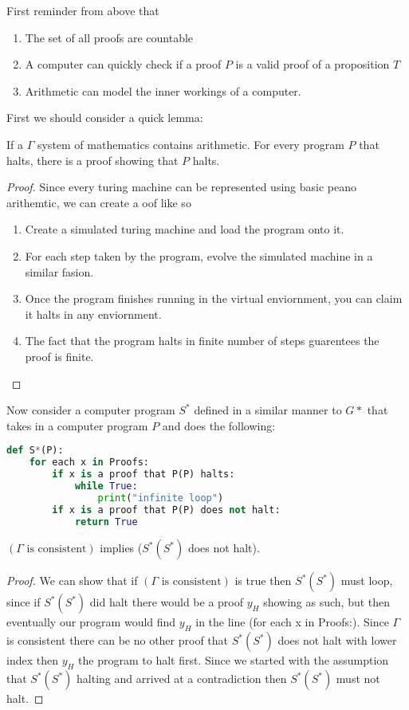     First reminder from above that 
    \begin{enumerate}
        \item The set of all proofs are countable
        \item A computer can quickly check if a proof $P$ is a valid proof of a proposition $T$
        \item Arithmetic can model the inner workings of a computer.
    \end{enumerate}
First we should consider a quick lemma:
\begin{lemma}
    If a $\Gamma$ system of mathematics contains arithmetic. For every program $P$ that halts, there is a proof showing that $P$ halts.
\end{lemma}
\begin{proof}
    Since every turing machine can be represented using basic peano arithemtic, we can create a oof like so ~
    \begin{enumerate}
      \item Create a simulated turing machine and load the program onto it.
      \item For each step taken by the program, evolve the simulated machine in a similar fasion.
      \item Once the program finishes running in the virtual enviornment, you can claim it halts in any enviornment.
      \item The fact that the program halts in finite number of steps guarentees the proof is finite.
    \end{enumerate}
\end{proof}

Now consider a computer program $S^*$ defined in a similar manner to $G*$ that takes in a computer program $P$ and does the following:
\begin{lstlisting}[language=Python]
def S*(P):
    for each x in Proofs:
        if x is a proof that P(P) halts:
            while True:
                print("infinite loop")
        if x is a proof that P(P) does not halt:
            return True
\end{lstlisting}
\begin{lemma}
    $(\Gamma \text{ is consistent})$ implies ($S^*(S^*)$ does not halt).
    \label{lem:const-s}
\end{lemma}
\begin{proof}
    We can show that if $(\Gamma \text{ is consistent})$ is true then $S^*(S^*)$ must loop, since if $S^*(S^*)$ did halt there would be a proof $y_H$ showing as such, but then eventually our program would find $y_H$ in the line (for each x in Proofs:). Since $\Gamma$ is consistent there can be no other proof that $S^*(S^*)$ does not halt with lower index then $y_H$ the program to halt first. Since we started with the assumption that $S^*(S^*)$ halting and arrived at a contradiction then $S^*(S^*)$ must not halt.
\end{proof}

